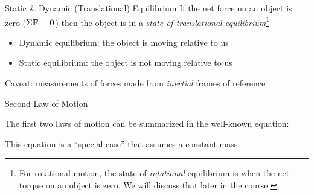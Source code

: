 \documentclass[12pt,compress,aspectratio=169]{beamer}
\newcommand{\mb}[1]{\ensuremath\mathbf{#1}}
\newcommand{\eq}[2]{\vspace{#1}{\Large\begin{displaymath}#2\end{displaymath}}}
\begin{document}
\begin{frame}{Static \& Dynamic (Translational) Equilibrium}
  If the net force on an object is zero ($\Sigma\mb{F}=\mb{0}$) then the
  object is in a \emph{state of translational equilibrium}\footnote{For
    rotational motion, the state of \emph{rotational} equilibrium is when the
    net torque on an object is zero. We will discuss that later in the course.}
  \begin{itemize}
  \item Dynamic equilibrium: the object is moving relative to us
  \item Static equilibrium: the object is not moving relative to us
  \end{itemize}
  Caveat: measurements of forces made from \emph{inertial} frames of reference
\end{frame}



\begin{frame}{Second Law of Motion}
  \begin{center}
  \end{center}
  \vspace{.3in}The first two laws of motion can be summarized in the well-known
  equation:

  \eq{-.2in}{
    \boxed{\mb{F}_\text{net}=\Sigma\mb{F}=m\mb{a}}
  }

  \textcolor{red!80!black}{This equation is a ``special case'' that assumes a
    constant mass.}
\end{frame}
\end{document}
